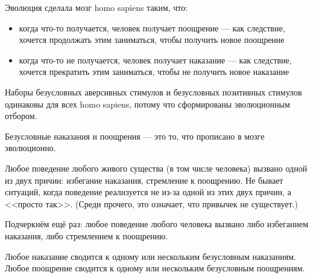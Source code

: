 \documentclass[11pt]{article}
\theoremstyle{remark}
\theoremstyle{definition}
\begin{document}
Эволюция сделала мозг homo sapiens таким, что:

\begin{itemize}
\item когда что-то получается, человек получает поощрение --- как следствие, хочется продолжать этим заниматься, чтобы получить новое поощрение
\item когда что-то не получается, человек получает наказание --- как следствие, хочется прекратить этим заниматься, чтобы не получить новое наказание
\end{itemize}




Наборы безусловных аверсивных стимулов и безусловных позитивных стимулов одинаковы для всех homo sapiens, потому что сформированы эволюционным отбором. 

Безусловные наказания и поощрения — это то, что прописано в мозге эволюционно. 




Любое поведение любого живого существа (в том числе человека) вызвано одной из двух причин: избегание наказания, стремление к поощрению. Не бывает ситуаций, когда поведение реализуется не из-за одной из этих двух причин, а <<просто так>>. (Среди прочего, это означает, что привычек не существует.)

Подчеркнём ещё раз: любое поведение любого человека вызвано либо избеганием наказания, либо стремлением к поощрению.


Любое наказание сводится к одному или нескольким безусловным наказаниям. Любое поощрение сводится к одному или нескольким безусловным поощрениям.











\end{document}
